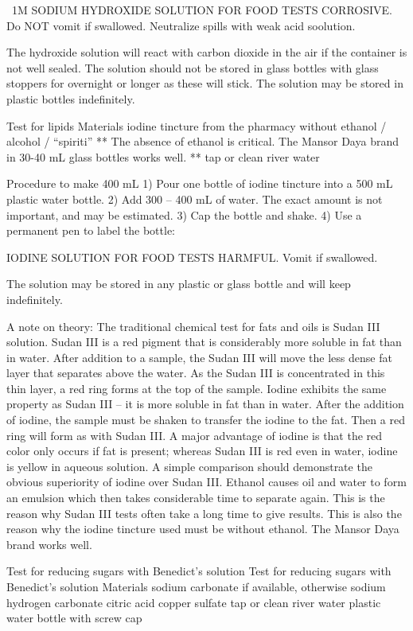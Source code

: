 \begin{enumerate}
~1M SODIUM HYDROXIDE SOLUTION FOR FOOD TESTS
CORROSIVE. Do NOT vomit if swallowed.
Neutralize spills with weak acid soolution. 

	The hydroxide solution will react with carbon dioxide in the air if the container is not well sealed. The solution should not be stored in glass bottles with glass stoppers for overnight or longer as these will stick. The solution may be stored in plastic bottles indefinitely.

Test for lipids
Materials
	iodine tincture from the pharmacy without ethanol / alcohol / “spiriti”
** The absence of ethanol is critical. The Mansor Daya brand in 30-40 mL glass bottles works well. **
	tap or clean river water 

Procedure to make 400 mL
1)	Pour one bottle of iodine tincture into a 500 mL plastic water bottle.
2)	Add 300 – 400 mL of water. The exact amount is not important, and may be estimated.
3)	Cap the bottle and shake.
4)	Use a permanent pen to label the bottle:


IODINE SOLUTION FOR FOOD TESTS
HARMFUL. Vomit if swallowed.

	The solution may be stored in any plastic or glass bottle and will keep indefinitely.

A note on theory:
	The traditional chemical test for fats and oils is Sudan III solution. Sudan III is a red pigment that is considerably more soluble in fat than in water. After addition to a sample, the Sudan III will move the less dense fat layer that separates above the water. As the Sudan III is concentrated in this thin layer, a red ring forms at the top of the sample.
	Iodine exhibits the same property as Sudan III – it is more soluble in fat than in water. After the addition of iodine, the sample must be shaken to transfer the iodine to the fat. Then a red ring will form as with Sudan III. A major advantage of iodine is that the red color only occurs if fat is present; whereas Sudan III is red even in water, iodine is yellow in aqueous solution. A simple comparison should demonstrate the obvious superiority of iodine over Sudan III.
	Ethanol causes oil and water to form an emulsion which then takes considerable time to separate again. This is the reason why Sudan III tests often take a long time to give results. This is also the reason why the iodine tincture used must be without ethanol. The Mansor Daya brand works well.


Test for reducing sugars with Benedict's solution
Test for reducing sugars with Benedict's solution
Materials
	sodium carbonate if available, otherwise sodium hydrogen carbonate
	citric acid
	copper sulfate
	tap or clean river water
	plastic water bottle with screw cap


\end{enumerate}
